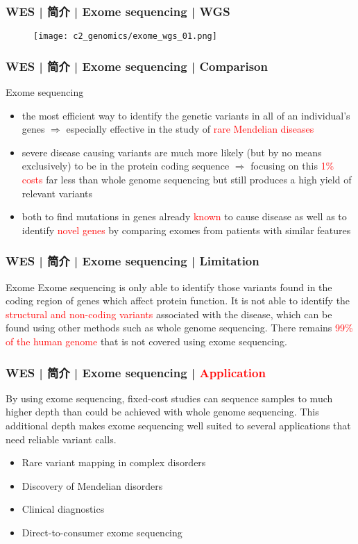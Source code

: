 \begin{frame}
  \frametitle{WES | 简介 | Exome sequencing | WGS}
  \begin{figure}
    \centering
    \texttt{[image: c2\_genomics/exome\_wgs\_01.png]}
  \end{figure}
\end{frame}

\begin{frame}
  \frametitle{WES | 简介 | Exome sequencing | Comparison}
  \begin{block}{Exome sequencing}
    \begin{itemize}
      \item the most efficient way to identify the genetic variants in all of an individual's genes $\Rightarrow$ especially effective in the study of \textcolor{red}{rare Mendelian diseases}
      \item severe disease causing variants are much more likely (but by no means exclusively) to be in the protein coding sequence $\Rightarrow$ focusing on this \textcolor{red}{1\% costs} far less than whole genome sequencing but still produces a high yield of relevant variants
      \item both to find mutations in genes already \textcolor{red}{known} to cause disease as well as to identify \textcolor{red}{novel genes} by comparing exomes from patients with similar features
    \end{itemize}
  \end{block}
\end{frame}

\begin{frame}
  \frametitle{WES | 简介 | Exome sequencing | Limitation}
  \begin{block}{Exome}
    Exome sequencing is only able to identify those variants found in the coding region of genes which affect protein function. It is not able to identify the \textcolor{red}{structural and non-coding variants} associated with the disease, which can be found using other methods such as whole genome sequencing. There remains \textcolor{red}{99\% of the human genome} that is not covered using exome sequencing.
  \end{block}
\end{frame}

\begin{frame}
  \frametitle{WES | 简介 | Exome sequencing | \textcolor{red}{Application}}
  By using exome sequencing, fixed-cost studies can sequence samples to much higher depth than could be achieved with whole genome sequencing. This additional depth makes exome sequencing well suited to several applications that need reliable variant calls.
  \begin{itemize}
    \item Rare variant mapping in complex disorders
    \item Discovery of Mendelian disorders
    \item Clinical diagnostics
    \item Direct-to-consumer exome sequencing
  \end{itemize}
\end{frame}

